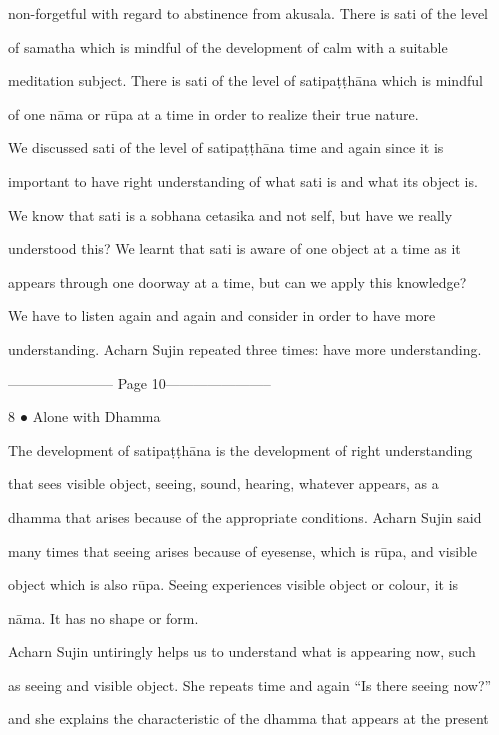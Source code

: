 non-forgetful with regard to abstinence from akusala. There is sati of the level  

of   samatha   which   is   mindful   of  the   development   of   calm   with   a  suitable  

meditation subject. There is sati of the level of satipaṭṭhāna which is mindful  

of one nāma or rūpa at a time in order to realize their true nature. 

   We  discussed  sati  of  the  level  of  satipaṭṭhāna  time  and  again  since  it  is  

important to have right understanding  of what  sati  is  and what its  object  is.  

We   know   that  sati  is  a  sobhana  cetasika  and  not  self,  but  have   we   really  

understood  this?  We  learnt  that  sati  is  aware  of  one  object  at  a  time  as  it  

appears through one doorway at a time, but can we apply this knowledge? 

   We  have   to  listen  again  and  again  and  consider  in  order  to   have  more  

understanding. Acharn Sujin repeated three times: have more understanding. 


----------------------- Page 10-----------------------

8 ● Alone with Dhamma 



The  development  of  satipaṭṭhāna  is  the  development  of  right  understanding  

that   sees   visible   object,   seeing,   sound,   hearing,   whatever   appears,   as   a  

dhamma that  arises because of the  appropriate conditions. Acharn  Sujin  said  

many times that seeing arises because of eyesense, which is rūpa, and visible  

object  which   is  also  rūpa.  Seeing  experiences  visible   object  or  colour,  it  is  

nāma. It has no shape or form. 

   Acharn Sujin untiringly helps us to understand what is appearing now, such  

as seeing and visible object. She repeats time and again “Is there seeing now?”  

and she explains the characteristic of the dhamma that appears at the present  

